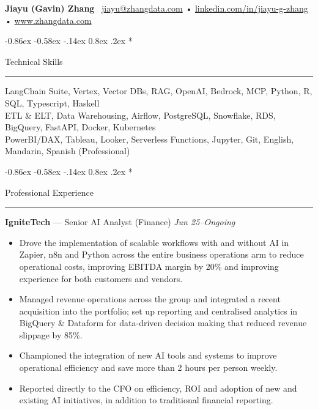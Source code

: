 \documentclass[10pt,letterpaper]{article}
\makeatletter
\renewcommand{\section}{\@startsection{section}{1}{\z@}%
  {-0.86ex \@plus -0.58ex \@minus -.14ex}%
  {0.8ex \@plus.2ex}%
  {\normalfont\large\bfseries}}
\newcommand{\name}{Jiayu (Gavin) Zhang}
\newcommand{\emailaddr}{jiayu@zhangdata.com}
\newcommand{\linkedin}{https://www.linkedin.com/in/jiayu-g-zhang}
\newcommand{\website}{https://www.zhangdata.com}
\makeatother
\begin{document}
{\LARGE\bfseries \name} \, \href{mailto:\emailaddr}{\emailaddr} • \href{\linkedin}{linkedin.com/in/jiayu-g-zhang} • \href{\website}{www.zhangdata.com}

\section*{Technical Skills\strut}
\hrule\vspace{0.2em}
LangChain Suite, Vertex, Vector DBs, RAG, OpenAI, Bedrock, MCP, Python, R, SQL, Typescript, Haskell\\
ETL \& ELT, Data Warehousing, Airflow, PostgreSQL, Snowflake, RDS, BigQuery, FastAPI, Docker, Kubernetes\\
PowerBI/DAX, Tableau, Looker, Serverless Functions, Jupyter, Git, English, Mandarin, Spanish (Professional)

\section*{Professional Experience\strut}
\hrule\vspace{0.2em}

{\bfseries IgniteTech} — Senior AI Analyst (Finance) \hfill \textit{Jun 25--Ongoing}\vspace{-0.2em}
\begin{itemize}
  \item Drove the implementation of scalable workflows with and without AI in Zapier, n8n and Python across the entire business operations arm to reduce operational costs, improving EBITDA margin by 20\% and improving experience for both customers and vendors.
  \item Managed revenue operations across the group and integrated a recent acquisition into the portfolio; set up reporting and centralised analytics in BigQuery \& Dataform for data-driven decision making that reduced revenue slippage by 85\%.
  \item Championed the integration of new AI tools and systems to improve operational efficiency and save more than 2 hours per person weekly.
  \item Reported directly to the CFO on efficiency, ROI and adoption of new and existing AI initiatives, in addition to traditional financial reporting.
\end{itemize}
\end{document}
